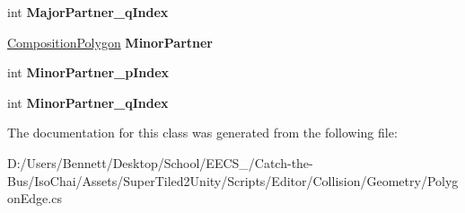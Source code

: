 \begin{DoxyCompactItemize}
int {\bfseries Major\+Partner\+\_\+q\+Index}
\item 
\mbox{\label{class_super_tiled2_unity_1_1_editor_1_1_geometry_1_1_polygon_edge_a3e5c02ca8a611a45f1f0208f7bb2585b}} 
\mbox{\hyperlink{class_super_tiled2_unity_1_1_editor_1_1_geometry_1_1_composition_polygon}{Composition\+Polygon}} {\bfseries Minor\+Partner}
\item 
\mbox{\label{class_super_tiled2_unity_1_1_editor_1_1_geometry_1_1_polygon_edge_ae20b1f11a2b3ac95f9f5870b6d4fa9b0}} 
int {\bfseries Minor\+Partner\+\_\+p\+Index}
\item 
\mbox{\label{class_super_tiled2_unity_1_1_editor_1_1_geometry_1_1_polygon_edge_a201dd5d820e87595e5970eb4824c3911}} 
int {\bfseries Minor\+Partner\+\_\+q\+Index}
\end{DoxyCompactItemize}


The documentation for this class was generated from the following file\+:\begin{DoxyCompactItemize}
\item 
D\+:/\+Users/\+Bennett/\+Desktop/\+School/\+E\+E\+C\+S\+\_/\+Catch-\/the-\/\+Bus/\+Iso\+Chai/\+Assets/\+Super\+Tiled2\+Unity/\+Scripts/\+Editor/\+Collision/\+Geometry/Polygon\+Edge.\+cs\end{DoxyCompactItemize}
